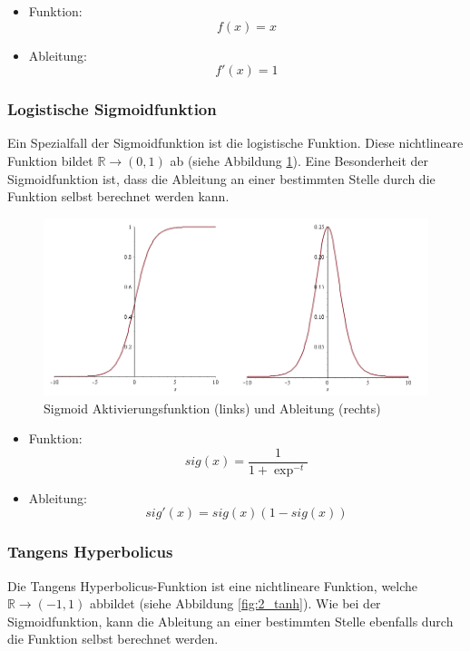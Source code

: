 \begin{itemize}
\item Funktion:  
\begin{equation} 
f(x) =  x 
\end{equation}
\item Ableitung: 
\begin{equation} 
f'(x) = 1 
\end{equation}
\end{itemize}


\subsubsection{Logistische Sigmoidfunktion}
Ein Spezialfall der Sigmoidfunktion ist die logistische Funktion. Diese nichtlineare Funktion bildet $\mathbb{R} \rightarrow (0,1) $ ab (siehe Abbildung \ref{fig:2_sig}). Eine Besonderheit der Sigmoidfunktion ist, dass die Ableitung an einer bestimmten Stelle durch die Funktion selbst berechnet werden kann.

 \begin{figure}[H]
 \centering
 \includegraphics[width=0.6\linewidth]{images/2_sigmoid}
 \caption[Sigmoid Aktivierungsfunktion und Ableitung]{Sigmoid Aktivierungsfunktion (links) und Ableitung (rechts)}
 \label{fig:2_sig}
 \end{figure}
 
 \begin{itemize}
 \item Funktion: 
  \begin{equation} 
 sig(x) = \frac{1}{1 + \exp^{-t}}  
 \end{equation}
 \item Ableitung: 
 \begin{equation} 
 sig'(x) = sig(x)(1-sig(x))
 \end{equation}
 \end{itemize}

\subsubsection{Tangens Hyperbolicus}
Die Tangens Hyperbolicus-Funktion ist eine nichtlineare Funktion, welche $\mathbb{R} \rightarrow (-1,1) $ abbildet (siehe Abbildung \ref{fig:2_tanh}). Wie bei der Sigmoidfunktion, kann die Ableitung an einer bestimmten Stelle ebenfalls durch die Funktion selbst berechnet werden.

